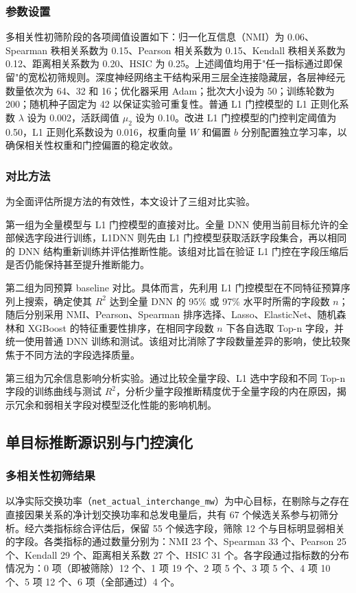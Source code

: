 \documentclass[UTF8,zihao=5,twoside]{ctexart}
\numberwithin{equation}{section}
\newcommand{\code}[1]{\texttt{#1}}
\begin{document}
\subsubsection{参数设置}
多相关性初筛阶段的各项阈值设置如下：归一化互信息（NMI）为 0.06、Spearman 秩相关系数为 0.15、Pearson 相关系数为 0.15、Kendall 秩相关系数为 0.12、距离相关系数为 0.20、HSIC 为 0.25。上述阈值均用于"任一指标通过即保留"的宽松初筛规则。深度神经网络主干结构采用三层全连接隐藏层，各层神经元数量依次为 64、32 和 16；优化器采用 Adam；批次大小设为 50；训练轮数为 200；随机种子固定为 42 以保证实验可重复性。普通 L1 门控模型的 L1 正则化系数 $\lambda$ 设为 0.002，活跃阈值 $\mu_2$ 设为 0.10。改进 L1 门控模型的门控判定阈值为 0.50，L1 正则化系数设为 0.016，权重向量 $W$ 和偏置 $b$ 分别配置独立学习率，以确保相关性权重和门控偏置的稳定收敛。

\subsubsection{对比方法}
为全面评估所提方法的有效性，本文设计了三组对比实验。

第一组为全量模型与 L1 门控模型的直接对比。全量 DNN 使用当前目标允许的全部候选字段进行训练，L1DNN 则先由 L1 门控模型获取活跃字段集合，再以相同的 DNN 结构重新训练并评估推断性能。该组对比旨在验证 L1 门控在字段压缩后是否仍能保持甚至提升推断能力。

第二组为同预算 baseline 对比。具体而言，先利用 L1 门控模型在不同特征预算序列上搜索，确定使其 $R^2$ 达到全量 DNN 的 95\% 或 97\% 水平时所需的字段数 $n$；随后分别采用 NMI、Pearson、Spearman 排序选择、Lasso、ElasticNet、随机森林和 XGBoost 的特征重要性排序，在相同字段数 $n$ 下各自选取 Top-n 字段，并统一使用普通 DNN 训练和测试。该组对比消除了字段数量差异的影响，使比较聚焦于不同方法的字段选择质量。

第三组为冗余信息影响分析实验。通过比较全量字段、L1 选中字段和不同 Top-n 字段的训练曲线与测试 $R^2$，分析少量字段推断精度优于全量字段的内在原因，揭示冗余和弱相关字段对模型泛化性能的影响机制。

\subsection{单目标推断源识别与门控演化}
\subsubsection{多相关性初筛结果}
以净实际交换功率（\code{net\_actual\_interchange\_mw}）为中心目标，在剔除与之存在直接因果关系的净计划交换功率和总发电量后，共有 67 个候选关系参与初筛分析。经六类指标综合评估后，保留 55 个候选字段，筛除 12 个与目标明显弱相关的字段。各类指标的通过数量分别为：NMI 23 个、Spearman 33 个、Pearson 25 个、Kendall 29 个、距离相关系数 27 个、HSIC 31 个。各字段通过指标数的分布情况为：0 项（即被筛除）12 个、1 项 19 个、2 项 5 个、3 项 5 个、4 项 10 个、5 项 12 个、6 项（全部通过）4 个。
\end{document}
